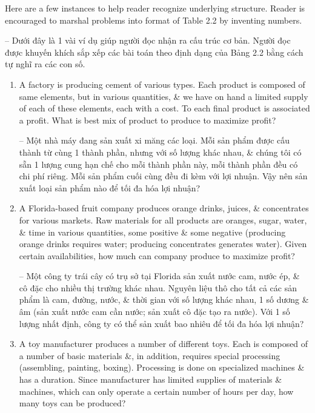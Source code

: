 \documentclass{article}
\begin{document}
\begin{itemize}
\begin{itemize}
\begin{itemize}
            Here are a few instances to help reader recognize underlying structure. Reader is encouraged to marshal problems into format of Table 2.2 by inventing numbers.

            -- Dưới đây là 1 vài ví dụ giúp người đọc nhận ra cấu trúc cơ bản. Người đọc được khuyến khích sắp xếp các bài toán theo định dạng của Bảng 2.2 bằng cách tự nghĩ ra các con số.
            \begin{enumerate}
                \item A factory is producing cement of various types. Each product is composed of same elements, but in various quantities, \& we have on hand a limited supply of each of these elements, each with a cost. To each final product is associated a profit. What is best mix of product to produce to maximize profit?

                -- Một nhà máy đang sản xuất xi măng các loại. Mỗi sản phẩm được cấu thành từ cùng 1 thành phần, nhưng với số lượng khác nhau, \& chúng tôi có sẵn 1 lượng cung hạn chế cho mỗi thành phần này, mỗi thành phần đều có chi phí riêng. Mỗi sản phẩm cuối cùng đều đi kèm với lợi nhuận. Vậy nên sản xuất loại sản phẩm nào để tối đa hóa lợi nhuận?
                \item A Florida-based fruit company produces orange drinks, juices, \& concentrates for various markets. Raw materials for all products are oranges, sugar, water, \& time in various quantities, some positive \& some negative (producing orange drinks requires water; producing concentrates generates water). Given certain availabilities, how much can company produce to maximize profit?

                -- Một công ty trái cây có trụ sở tại Florida sản xuất nước cam, nước ép, \& cô đặc cho nhiều thị trường khác nhau. Nguyên liệu thô cho tất cả các sản phẩm là cam, đường, nước, \& thời gian với số lượng khác nhau, 1 số dương \& âm (sản xuất nước cam cần nước; sản xuất cô đặc tạo ra nước). Với 1 số lượng nhất định, công ty có thể sản xuất bao nhiêu để tối đa hóa lợi nhuận?
                \item A toy manufacturer produces a number of different toys. Each is composed of a number of basic materials \&, in addition, requires special processing (assembling, painting, boxing). Processing is done on specialized machines \& has a duration. Since manufacturer has limited supplies of materials \& machines, which can only operate a certain number of hours per day, how many toys can be produced?


\end{enumerate}
\end{itemize}
\end{itemize}
\end{itemize}
\end{document}

